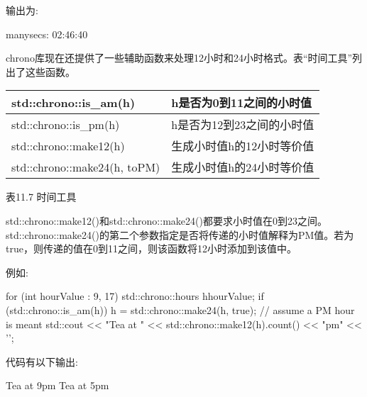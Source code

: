 输出为:

\begin{shell}
manysecs: 02:46:40
\end{shell}


chrono库现在还提供了一些辅助函数来处理12小时和24小时格式。表“时间工具”列出了这些函数。

\begin{longtable}[c]{|l|l|}
\hline
std::chrono::is\_am(h)       & h是否为0到11之间的小时值  \\ \hline
\endfirsthead
%
\endhead
%
std::chrono::is\_pm(h)       & h是否为12到23之间的小时值 \\ \hline
std::chrono::make12(h)       & 生成小时值h的12小时等价值   \\ \hline
std::chrono::make24(h, toPM) & 生成小时值h的24小时等价值   \\ \hline
\end{longtable}

\begin{center}
表11.7 时间工具
\end{center}

std::chrono::make12()和std::chrono::make24()都要求小时值在0到23之间。std::chrono::make24()的第二个参数指定是否将传递的小时值解释为PM值。若为true，则传递的值在0到11之间，则该函数将12小时添加到该值中。

例如:

\begin{cpp}
for (int hourValue : {9, 17}) {
	std::chrono::hours h{hourValue};
	if (std::chrono::is_am(h)) {
		h = std::chrono::make24(h, true); // assume a PM hour is meant
	}
	std::cout << "Tea at " << std::chrono::make12(h).count() << "pm" << '\n';
}
\end{cpp}

代码有以下输出:

\begin{shell}
Tea at 9pm
Tea at 5pm
\end{shell}










